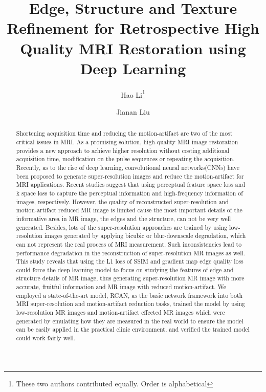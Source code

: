 \documentclass[runningheads]{llncs}
\makeatletter
\newcommand{\printfnsymbol}[1]{
  \textsuperscript{\@fnsymbol{#1}}
}
\makeatother
\begin{document}
\title{Edge, Structure and Texture Refinement for Retrospective High Quality MRI Restoration using Deep Learning}

\author{Hao Li\thanks{These two authors contributed equally. Order is alphabetical} \and
Jianan Liu\printfnsymbol{1}}
%


%
\maketitle
%
\begin{abstract} Shortening acquisition time and reducing the motion-artifact are two of the most critical issues in MRI. As a promising solution, high-quality MRI image restoration provides a new approach to achieve higher resolution without costing additional acquisition time, modification on the pulse sequences or repeating the acquisition. Recently, as to the rise of deep learning, convolutional neural networks(CNNs) have been proposed to generate super-resolution images and reduce the motion-artifact for MRI applications. Recent studies suggest that using perceptual feature space loss and k space loss to capture the perceptual information and high-frequency information of images, respectively. However, the quality of reconstructed super-resolution and motion-artifact reduced MR image is limited cause the most important details of the informative area in MR image, the edges and the structure, can not be very well generated. Besides, lots of the super-resolution approaches are trained by using low-resolution images generated by applying bicubic or blur-downscale degradation, which can not represent the real process of MRI measurement. Such inconsistencies lead to performance degradation in the reconstruction of super-resolution MR images as well. This study reveals that using the L1 loss of SSIM and gradient map edge quality loss could force the deep learning model to focus on studying the features of edge and structure details of MR image, thus generating super-resolution MR image with more accurate, fruitful information and MR image with reduced motion-artifact. We employed a state-of-the-art model, RCAN, as the basic network framework into both MRI super-resolution and motion-artifact reduction tasks, trained the model by using low-resolution MR images and motion-artifact effected MR images which were generated by emulating how they are measured in the real world to ensure the model can be easily applied in the practical clinic environment, and verified the trained model could work fairly well.

\end{abstract}
%
%
%
\end{document}
